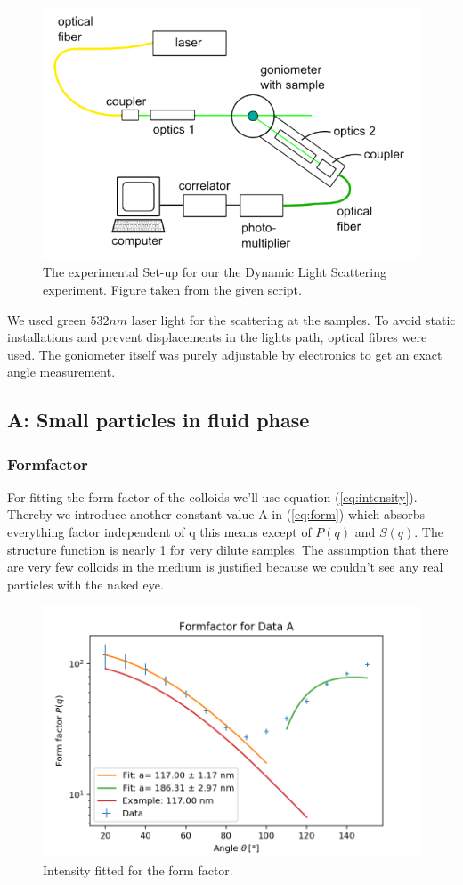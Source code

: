 \documentclass[]{article}
\begin{document}
\begin{figure}[!htbp]
\centering
\includegraphics[width=0.8\linewidth]{Plots/Setup.png}
\caption{The experimental Set-up for our the Dynamic Light Scattering experiment. Figure taken from the given script.}
\end{figure}

We used green $532nm$ laser light for the scattering at the samples. To avoid static installations and prevent displacements in the lights path, optical fibres were used. The goniometer itself was purely adjustable by electronics to get an exact angle measurement.


\subsection{A: Small particles in fluid phase}
\subsubsection{Formfactor}


For fitting the form factor of the colloids we'll use equation (\ref{eq:intensity}). Thereby we introduce another constant value A in (\ref{eq:form}) which absorbs everything factor independent of q this means except of $P(q)$ and $S(q)$. The structure function is nearly 1 for very dilute samples. The assumption that there are very few colloids in the medium is justified because we couldn't see any real particles 
with the naked eye. 



\begin{figure}[!htbp]
\centering
\includegraphics[width=0.8\linewidth]{Plots/FormA.png}
\caption{Intensity fitted for the form factor.}
\label{FormA}
\end{figure}
\end{document}
